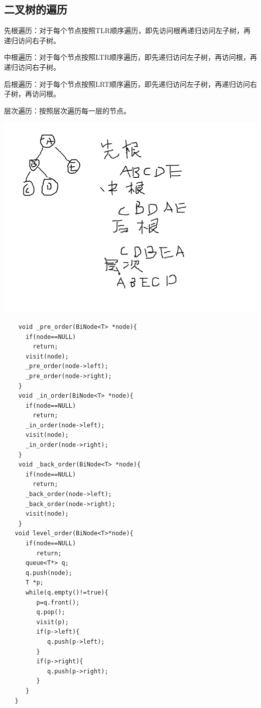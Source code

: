 \documentclass{article}
\begin{document}
	\subsection{二叉树的遍历}
		先根遍历：对于每个节点按照TLR顺序遍历，即先访问根再递归访问左子树，再递归访问右子树。

		中根遍历：对于每个节点按照LTR顺序遍历，即先递归访问左子树，再访问根，再递归访问右子树。

		后根遍历：对于每个节点按照LRT顺序遍历，即先递归访问左子树，再递归访问右子树，再访问根。

		层次遍历：按照层次遍历每一层的节点。

		\includegraphics[scale=0.4]{./pic/tree-04.png}

		\begin{verbatim}
    void _pre_order(BiNode<T> *node){
      if(node==NULL)
        return;
      visit(node);
      _pre_order(node->left);
      _pre_order(node->right);
    }
    void _in_order(BiNode<T> *node){
      if(node==NULL)
        return;
      _in_order(node->left);
      visit(node);
      _in_order(node->right);
    }
    void _back_order(BiNode<T> *node){
      if(node==NULL)
        return;
      _back_order(node->left);
      _back_order(node->right);
      visit(node);
    }
   void level_order(BiNode<T>*node){
      if(node==NULL)
         return;
      queue<T*> q;
      q.push(node);
      T *p;
      while(q.empty()!=true){
         p=q.front();
         q.pop();
         visit(p);
         if(p->left){
            q.push(p->left);
         }
         if(p->right){
            q.push(p->right);
         }
      }
   }
		\end{verbatim}
\end{document}
